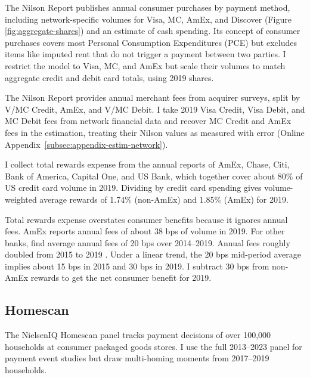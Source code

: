 \documentclass[main.tex]{subfiles}
\begin{document}
The Nilson Report publishes annual consumer purchases by payment method, including network-specific volumes for Visa, MC, AmEx, and Discover (Figure \ref{fig:aggregate-shares}) and an estimate of cash spending.
Its concept of consumer purchases covers most Personal Consumption Expenditures (PCE) but excludes items like imputed rent that do not trigger a payment between two parties.
I restrict the model to Visa, MC, and AmEx but scale their volumes to match aggregate credit and debit card totals, using 2019 shares.

The Nilson Report provides annual merchant fees from acquirer surveys, split by V/MC Credit, AmEx, and V/MC Debit.
I take 2019 Visa Credit, Visa Debit, and MC Debit fees from network financial data and recover MC Credit and AmEx fees in the estimation, treating their Nilson values as measured with error (Online Appendix~\ref{subsec:appendix-estim-network}).

I collect total rewards expense from the annual reports of AmEx, Chase, Citi, Bank of America, Capital One, and US Bank, which together cover about 80\% of US credit card volume in 2019.
Dividing by credit card spending gives volume-weighted average rewards of 1.74\% (non-AmEx) and 1.85\% (AmEx) for 2019.

Total rewards expense overstates consumer benefits because it ignores annual fees.
AmEx reports annual fees of about 38 bps of volume in 2019.
For other banks, \textcite{Adams.Bord2020} find average annual fees of 20 bps over 2014--2019.
Annual fees roughly doubled from 2015 to 2019 \parencite{CFPB2021}. Under a linear trend, the 20 bps mid-period average implies about 15 bps in 2015 and 30 bps in 2019.
I subtract 30 bps from non-AmEx rewards to get the net consumer benefit for 2019.

\subsection{Homescan}

The NielsenIQ Homescan panel tracks payment decisions of over 100,000 households at consumer packaged goods stores.
I use the full 2013--2023 panel for payment event studies but draw multi-homing moments from 2017--2019 households.
\end{document}

